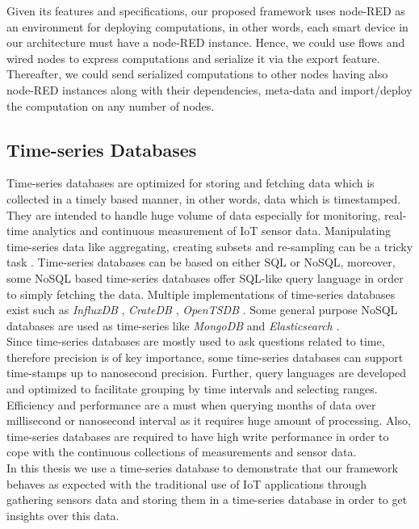 \noindent Given its features and specifications, our proposed framework uses node-RED as an environment for deploying computations, in other words, each smart device in our architecture must have a node-RED instance. Hence, we could use  flows and wired nodes to express computations and serialize it via the export feature. Thereafter, we could send serialized computations to other nodes having also node-RED instances along with their dependencies, meta-data and import/deploy the computation on any number of nodes. 

\subsection{Time-series Databases}

Time-series databases are optimized for storing  and fetching data which is collected in a timely based manner, in other words, data which is timestamped. They are intended to handle huge volume of data especially for monitoring, real-time analytics and continuous measurement of IoT sensor data. Manipulating time-series data like aggregating, creating subsets and re-sampling can be a tricky task \cite{Leighton2015}. Time-series databases can be based on either SQL or NoSQL, moreover, some NoSQL based time-series databases offer SQL-like query language in order to simply fetching the data. Multiple implementations of time-series databases exist such as \textit{InfluxDB} \cite{Influxdb}, \textit{CrateDB } \cite{CrateDB},  \textit{OpenTSDB} \cite{Opentsdb}. Some general purpose NoSQL databases are used as time-series  like \textit{MongoDB} \cite{MongoDB} and \textit{Elasticsearch} \cite{Elasticsearch}.\\

\noindent Since time-series databases are mostly used to ask questions related to time, therefore precision is of key importance, some time-series databases can support time-stamps up to nanosecond precision. Further, query languages are developed and optimized to facilitate grouping by time intervals and selecting ranges. Efficiency and performance are a must when querying months of data over millisecond or nanosecond interval as it requires huge amount of processing. Also, time-series databases are required to have high write performance in order to cope with the continuous collections of measurements and sensor data.  \\

\noindent In this thesis we use a time-series database to demonstrate that our framework behaves as expected with the traditional use of IoT applications through gathering sensors data  and storing them in a time-series database in order to get insights over this data.
 

